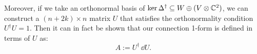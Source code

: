 	Moreover, if we take an orthonormal basis of $\ker \Delta^{\dagger} \subseteq W \oplus (V \otimes \mathbb{C}^2)$, we can construct a $(n+2k) \times n$ matrix $U$ that satisfies the orthonormality condition $U^\dagger U = 1$. Then it can in fact be shown that our connection 1-form is defined in terms of $U$ as:
	\[
		A := U^\dagger \, \dd U.
	\]



